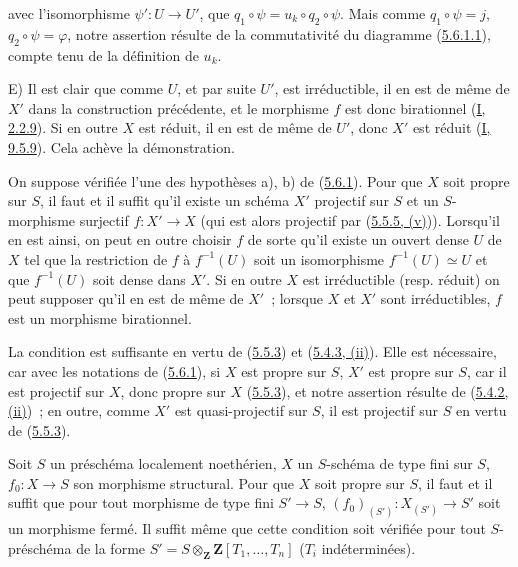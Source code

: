 
avec l'isomorphisme $\psi':U\to U'$, que
$q_1\circ\psi=u_k\circ q_2\circ\psi$. Mais comme $q_1\circ\psi=j$,
$q_2\circ\psi=\varphi$, notre assertion résulte de la commutativité du
diagramme (\hyperref[II.5.6.1.1-fr]{5.6.1.1}), compte tenu de la définition de
$u_k$.

E) Il est clair que comme $U$, et par suite $U'$, est irréductible, il en est
de même de $X'$ dans la construction précédente, et le morphisme $f$ est donc
birationnel (\hyperref[I.2.2.9-fr]{I, 2.2.9}). Si en outre $X$ est réduit, il
en est de même de $U'$, donc $X'$ est réduit
(\hyperref[I.9.5.9-fr]{I, 9.5.9}). Cela achève la démonstration.

\begin{corollary}[5.6.2]
\label{II.5.6.2-fr}
On suppose vérifiée l'une des hypothèses a), b) de
(\hyperref[II.5.6.1-fr]{5.6.1}). Pour que $X$ soit propre sur $S$, il faut et
il suffit qu'il existe un schéma $X'$ projectif sur $S$ et un $S$-morphisme
surjectif $f:X'\to X$ (qui est alors projectif par
(\hyperref[II.5.5.5-fr]{5.5.5, (v)})). Lorsqu'il en est ainsi, on peut en
outre choisir $f$ de sorte qu'il existe un ouvert dense $U$ de $X$ tel que la
restriction de $f$ à $f^{-1}(U)$ soit un isomorphisme
$f^{-1}(U)\simeq U$ et que $f^{-1}(U)$ soit dense dans $X'$. Si en outre $X$
est irréductible (resp. réduit) on peut supposer qu'il en est de même de
$X'$~; lorsque $X$ et $X'$ sont irréductibles, $f$ est un morphisme
birationnel.
\end{corollary}

La condition est suffisante en vertu de (\hyperref[II.5.5.3-fr]{5.5.3}) et
(\hyperref[II.5.4.3-fr]{5.4.3, (ii)}). Elle est nécessaire, car avec les
notations de (\hyperref[II.5.6.1-fr]{5.6.1}), si $X$ est propre sur $S$, $X'$
est propre sur $S$, car il est projectif sur $X$, donc propre sur $X$
(\hyperref[II.5.5.3-fr]{5.5.3}), et notre assertion résulte de
(\hyperref[II.5.4.2-fr]{5.4.2, (ii)})~; en outre, comme $X'$ est
quasi-projectif sur $S$, il est projectif sur $S$ en vertu de
(\hyperref[II.5.5.3-fr]{5.5.3}).

\begin{corollary}[5.6.3]
\label{II.5.6.3-fr}
Soit $S$ un préschéma localement noethérien, $X$ un $S$-schéma de type fini
sur $S$, $f_0:X\to S$ son morphisme structural. Pour que $X$ soit propre sur
$S$, il faut et il suffit que pour tout morphisme de type fini $S'\to S$,
$(f_0)_{(S')}:X_{(S')}\to S'$ soit un morphisme fermé. Il suffit même que
cette condition soit vérifiée pour tout $S$-préschéma de la forme
$S'=S\otimes_{\mathbf Z}\mathbf Z[T_1,\ldots,T_n]$ ($T_i$ indéterminées).
\end{corollary}

